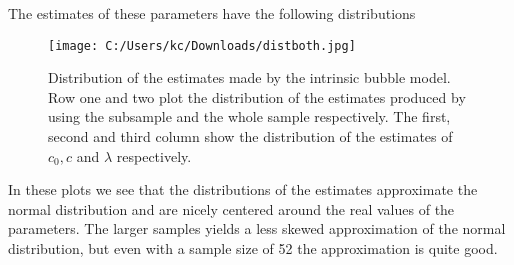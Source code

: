 \documentclass{article}
\begin{document}
The estimates of these parameters have the following distributions
\newpage
\begin{figure}[h]
	\centering
		\texttt{[image: C:/Users/kc/Downloads/distboth.jpg]}
	\caption{Distribution of the estimates made by the intrinsic bubble model. Row one and two plot the distribution of the estimates produced by using the subsample and the whole sample respectively. The first, second and third column show the distribution of the estimates of $c_0, c$ and $\lambda$ respectively. }
	\label{simulation}
\end{figure}

In these plots we see that the distributions of the estimates approximate the normal distribution and are nicely centered around the real values of the parameters. The larger samples yields a less skewed  approximation of the normal distribution, but even with a sample size of 52 the approximation is quite good. 
\end{document}
